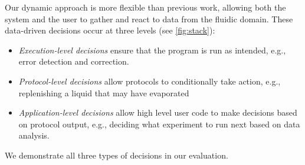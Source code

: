 \documentclass[sigplan, screen]{acmart}
\begin{document}
Our dynamic approach is more flexible than previous work, allowing both the system and the user to gather and react to data from the fluidic domain.
These data-driven decisions occur at three levels (see \autoref{fig:stack}):
\begin{itemize}
\item \emph{Execution-level decisions} ensure that the program is run as intended, e.g., error detection and correction.
\item \emph{Protocol-level decisions} allow protocols to conditionally take action, e.g., replenishing a liquid that may have evaporated
\item \emph{Application-level decisions} allow high level user code to make decisions based on protocol output, e.g., deciding what experiment to run next based on data analysis.
\end{itemize}
We demonstrate all three types of decisions in our evaluation.
\end{document}
